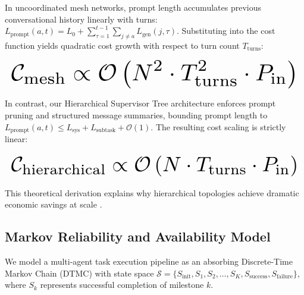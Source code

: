 \documentclass[10pt,twocolumn,letterpaper]{article}
\begin{document}
In uncoordinated mesh networks, prompt length accumulates previous conversational history linearly with turns: $L_{\text{prompt}}(a, t) = L_0 + \sum_{\tau=1}^{t-1} \sum_{j \ne a} L_{\text{gen}}(j, \tau)$. Substituting into the cost function yields quadratic cost growth with respect to turn count $T_{\text{turns}}$:








\begin{equation}
\resizebox{\columnwidth}{!}{$\displaystyle
\begin{aligned}
\mathcal{C}_{\text{mesh}} \propto \mathcal{O}\left(N^2 \cdot T_{\text{turns}}^2 \cdot P_{\text{in}}\right)
\end{aligned}
$}
\end{equation}








In contrast, our Hierarchical Supervisor Tree architecture enforces prompt pruning and structured message summaries, bounding prompt length to $L_{\text{prompt}}(a, t) \le L_{\text{sys}} + L_{\text{subtask}} + \mathcal{O}(1)$. The resulting cost scaling is strictly linear:








\begin{equation}
\resizebox{\columnwidth}{!}{$\displaystyle
\begin{aligned}
\mathcal{C}_{\text{hierarchical}} \propto \mathcal{O}\left(N \cdot T_{\text{turns}} \cdot P_{\text{in}}\right)
\end{aligned}
$}
\end{equation}








This theoretical derivation explains why hierarchical topologies achieve dramatic economic savings at scale \cite{arxiv_2501_02497}.




\subsection{Markov Reliability and Availability Model}


We model a multi-agent task execution pipeline as an absorbing Discrete-Time Markov Chain (DTMC) with state space $\mathcal{S} = \{S_{\text{init}}, S_1, S_2, \ldots, S_K, S_{\text{success}}, S_{\text{failure}}\}$, where $S_k$ represents successful completion of milestone $k$.
\end{document}
